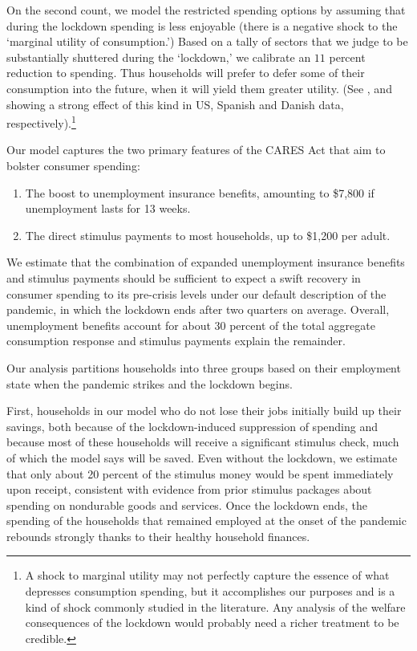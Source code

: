 \documentclass[titlepage,a4paper]{\econtex}
\begin{document}
On the second count, we model the restricted spending options by assuming that during the lockdown spending is less enjoyable (there is a negative shock to the `marginal utility of consumption.')
Based on a tally of sectors that we judge to be substantially shuttered during the `lockdown,' we calibrate an $11$ percent reduction to spending.
Thus households will prefer to defer some of their consumption into the future, when it will yield them greater utility. (See \cite{covidC_chase}, \cite{SpanishSpending} and \cite{denmark_pandemics} showing a strong effect of this kind in US, Spanish and Danish data, respectively).\footnote{A shock to marginal utility may not perfectly capture the essence of what depresses consumption spending, but it accomplishes our purposes and is a kind of shock commonly studied in the literature.  Any analysis of the welfare consequences of the lockdown would probably need a richer treatment to be credible.}

Our model captures the two primary features of the CARES Act that aim to bolster consumer spending:
\begin{enumerate}
\item The boost to unemployment insurance benefits, amounting to \$7,800 if unemployment lasts for 13 weeks.
\item The direct stimulus payments to most households, up to \$1,200 per adult.
\end{enumerate}

We estimate that the combination of expanded unemployment insurance benefits and stimulus payments should be sufficient to expect a swift recovery in consumer spending to its pre-crisis levels under our default description of the pandemic, in which the lockdown ends after two quarters on average.
Overall, unemployment benefits account for about 30 percent of the total aggregate consumption response and stimulus payments explain the remainder.

Our analysis partitions households into three groups based on their employment state when the pandemic strikes and the lockdown begins.

First, households in our model who do not lose their jobs initially build up their savings, both because of the lockdown-induced suppression of spending and because most of these households will receive a significant stimulus check, much of which the model says will be saved.
Even without the lockdown, we estimate that only about 20 percent of the stimulus money would be spent immediately upon receipt, consistent with evidence from prior stimulus packages about spending on nondurable goods and services.
Once the lockdown ends, the spending of the households that remained employed at the onset of the pandemic rebounds strongly thanks to their healthy household finances.
\end{document}
